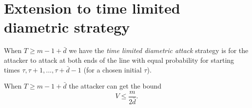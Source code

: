 \documentclass[11pt]{beamer}
\begin{document}
\section[]{Extension to time limited diametric strategy}
\hypertarget{Extension of correction strategy}{}
\begin{frame}{\insertsection}

\begin{definition}
When $T \geq m-1+\bar{d}$ we have the \textit{time limited diametric attack} strategy is for the attacker to attack at both ends of the line with equal probability for starting times $\tau,\tau +1,...,\tau + \bar{d}-1$ (for a chosen initial $\tau$).
\end{definition}

\begin{lemma}
When $T \geq m-1 +\bar{d}$ the attacker can get the bound
$$V \leq \dfrac{m}{2\bar{d}}.$$
\end{lemma}

\end{frame}
\end{document}
